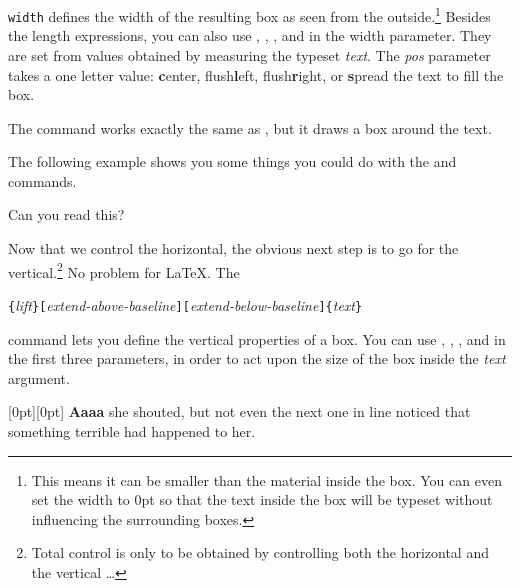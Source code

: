 \noindent \texttt{width} defines the width of the resulting box as
seen from the outside.\footnote{This means it can be smaller than the
  material inside the box. You can even set the
  width to 0pt so that the text inside the box will be typeset without
  influencing the surrounding boxes.}  Besides the length
expressions, you can also use , , , and
 in the width parameter. They are set from values
obtained by measuring the typeset \emph{text}. The \emph{pos} parameter takes
a one letter value: \textbf{c}enter, flush\textbf{l}eft,
flush\textbf{r}ight, or \textbf{s}pread the text to fill the box.

The command  works exactly the same as , but
it draws a box around the text.

The following example shows you some things you could do with
the  and  commands.

\begin{example}
\par
{}\par
{} \par
\hspace{1cm} %
 \par
{}
Can you read this?
\end{example}

Now that we control the horizontal, the obvious next step is to go for
the vertical.\footnote{Total control is only to be obtained by
  controlling both the horizontal and the vertical \ldots}
No problem for \LaTeX{}. The

\begin{lscommand}
  \verb|{|\emph{lift}\verb|}[|\emph{extend-above-baseline}\verb|][|\emph{extend-below-baseline}\verb|]{|\emph{text}\verb|}|
\end{lscommand}

\noindent command lets you define the vertical properties of a
box. You can use , , , and
 in the first three parameters, in order to act
upon the size of the box inside the \emph{text} argument.

\begin{example}[examplewidth=0.45\linewidth]
\raisebox{0pt}[0pt][0pt]{\Large%
\textbf{Aaaa\raisebox{-0.3ex}{a}%
\raisebox{-0.7ex}{aa}%
\raisebox{-1.2ex}{r}%
\raisebox{-2.2ex}{g}%
\raisebox{-4.5ex}{h}}}
she shouted, but not even the next
one in line noticed that something
terrible had happened to her.
\end{example}

